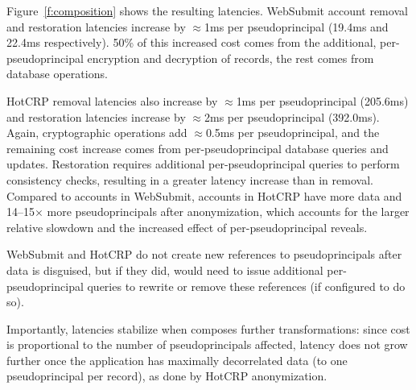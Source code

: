 %
Figure~\ref{f:composition} shows the resulting latencies.
%
WebSubmit account removal and restoration latencies increase by $\approx$1ms per
pseudoprincipal (19.4ms and 22.4ms respectively). 50\% of this increased cost
comes from the additional, per-pseudoprincipal encryption and decryption of
records, the rest comes from database operations.

%
HotCRP removal latencies also increase by $\approx$1ms per pseudoprincipal
(205.6ms) and restoration latencies increase by $\approx$2ms per pseudoprincipal
(392.0ms). Again, cryptographic operations add $\approx$0.5ms per
pseudoprincipal, and the remaining cost increase comes from
per-pseudo\-principal
database queries and updates. Restoration requires additional per-pseudoprincipal
queries to \eg perform consistency checks, resulting in a greater latency
increase than in removal. 
%
Compared to accounts in WebSubmit, accounts in HotCRP have more data and
14--15$\times$ more pseudoprincipals after anonymization, which accounts for the
larger relative slowdown and the increased effect of per-pseudoprincipal
reveals.

WebSubmit and HotCRP do not create new references to pseudoprincipals after data
is disguised, but if they did, \sys would need to issue additional
per-pseudoprincipal queries to rewrite or remove these references (if configured
to do so).
%
%
%
%
%

%
Importantly, \xxing latencies stabilize when \sys composes further \xxing
transformations: since cost is proportional to the number of pseudoprincipals
affected, latency does not grow further once the application has maximally decorrelated
data (to one pseudoprincipal per record), as done by HotCRP anonymization.
%



